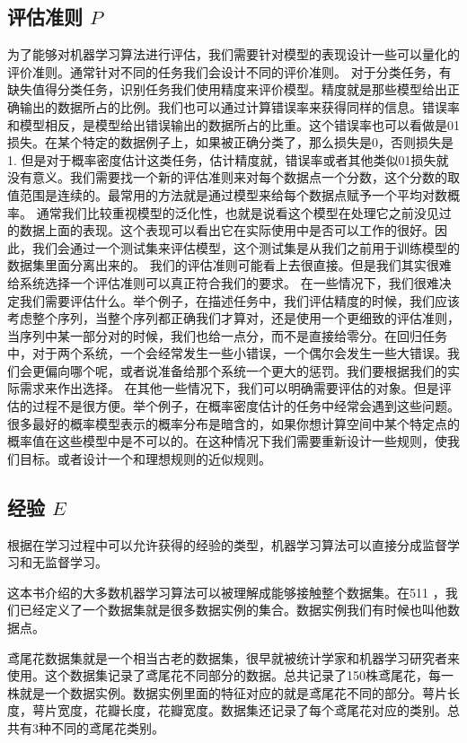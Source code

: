 \subsection{评估准则 $P$}
为了能够对机器学习算法进行评估，我们需要针对模型的表现设计一些可以量化的评价准则。通常针对不同的任务我们会设计不同的评价准则。
对于分类任务，有缺失值得分类任务，识别任务我们使用精度来评价模型。精度就是那些模型给出正确输出的数据所占的比例。我们也可以通过计算错误率来获得同样的信息。错误率和模型相反，是模型给出错误输出的数据所占的比重。这个错误率也可以看做是01损失。在某个特定的数据例子上，如果被正确分类了，那么损失是0，否则损失是1. 但是对于概率密度估计这类任务，估计精度就，错误率或者其他类似01损失就没有意义。我们需要找一个新的评估准则来对每个数据点一个分数，这个分数的取值范围是连续的。最常用的方法就是通过模型来给每个数据点赋予一个平均对数概率。
通常我们比较重视模型的泛化性，也就是说看这个模型在处理它之前没见过的数据上面的表现。这个表现可以看出它在实际使用中是否可以工作的很好。因此，我们会通过一个测试集来评估模型，这个测试集是从我们之前用于训练模型的数据集里面分离出来的。
我们的评估准则可能看上去很直接。但是我们其实很难给系统选择一个评估准则可以真正符合我们的要求。
在一些情况下，我们很难决定我们需要评估什么。举个例子，在描述任务中，我们评估精度的时候，我们应该考虑整个序列，当整个序列都正确我们才算对，还是使用一个更细致的评估准则，当序列中某一部分对的时候，我们也给一点分，而不是直接给零分。在回归任务中，对于两个系统，一个会经常发生一些小错误，一个偶尔会发生一些大错误。我们会更偏向哪个呢，或者说准备给那个系统一个更大的惩罚。我们要根据我们的实际需求来作出选择。
在其他一些情况下，我们可以明确需要评估的对象。但是评估的过程不是很方便。举个例子，在概率密度估计的任务中经常会遇到这些问题。很多最好的概率模型表示的概率分布是暗含的，如果你想计算空间中某个特定点的概率值在这些模型中是不可以的。在这种情况下我们需要重新设计一些规则，使我们目标。或者设计一个和理想规则的近似规则。



\subsection{经验 $E$}
根据在学习过程中可以允许获得的经验的类型，机器学习算法可以直接分成监督学习和无监督学习。

这本书介绍的大多数机器学习算法可以被理解成能够接触整个数据集。在511 ，我们已经定义了一个数据集就是很多数据实例的集合。数据实例我们有时候也叫他数据点。

鸢尾花数据集就是一个相当古老的数据集，很早就被统计学家和机器学习研究者来使用。这个数据集记录了鸢尾花不同部分的数据。总共记录了150株鸢尾花，每一株就是一个数据实例。数据实例里面的特征对应的就是鸢尾花不同的部分。萼片长度，萼片宽度，花瓣长度，花瓣宽度。数据集还记录了每个鸢尾花对应的类别。总共有3种不同的鸢尾花类别。

